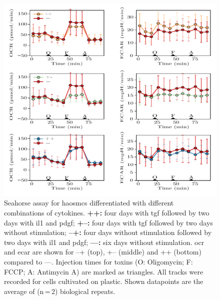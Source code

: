     \begin{figure}[h!]
    \capstart
        \centering
        \includegraphics{Abbildung/Seahorse_tracks.pdf}

        \begin{minipage}{\captionwidth}
            \caption[seahorse_tracks]{ \newline Seahorse assay for \acp{haosmc} differentiated with different combinations of cytokines.
            \textbf{++:} four days with \ac{tgf} followed by two days with \ac{il1} and \ac{pdgf};
            \textbf{+–:} four days with \ac{tgf} followed by two days without stimulation;
            \textbf{–+:} four days without stimulation followed by two days with \ac{il1} and \ac{pdgf};
            \textbf{––:} six days without stimulation.
            \ac{ocr} and \ac{ecar} are shown for –+ (top), +– (middle) and ++ (bottom) compared to ––. Injection times for toxins (O: Oligomycin; F: FCCP; A: Antimycin A) are marked as triangles. All tracks were recorded for cells cultivated on plastic. Shown datapoints are the average of (n\,=\,2) biological repeats.
            }
            \label{fig:seahorse_tracks}
        \end{minipage}
    \end{figure}

